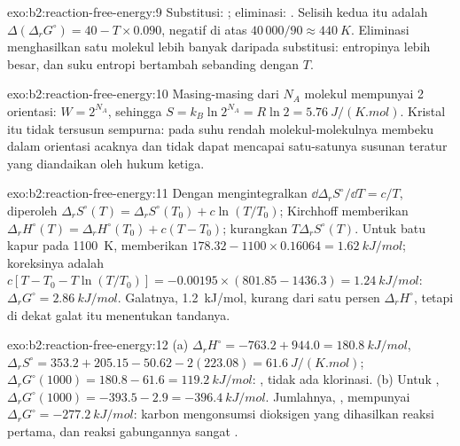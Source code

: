 \begin{solution}{exo:b2:reaction-free-energy:9}
Substitusi: ; eliminasi:
. Selisih kedua  itu adalah $\Delta(\Delta_r G^\circ) = 40 - T \times
0.090$, negatif di atas $40\,000/90 \approx \qty{440}{K}$. Eliminasi
menghasilkan satu molekul lebih banyak daripada substitusi: entropinya
lebih besar, dan suku entropi bertambah sebanding dengan $T$.
\end{solution}

\begin{solution}{exo:b2:reaction-free-energy:10}
Masing-masing dari $N_A$ molekul mempunyai 2 orientasi: $W = 2^{N_A}$,
sehingga $S =
k_B\ln 2^{N_A} = R\ln 2 = \qty{5.76}{J/(K.mol)}$. Kristal
itu tidak tersusun sempurna: pada suhu rendah molekul-molekulnya membeku
dalam orientasi acaknya dan tidak dapat mencapai satu-satunya susunan
teratur yang diandaikan oleh hukum ketiga.
\end{solution}

\begin{solution}{exo:b2:reaction-free-energy:11}
Dengan mengintegralkan $\dd\Delta_r S^\circ/\dd T = c/T$, diperoleh $\Delta_r S^\circ(T) = \Delta_r
S^\circ(T_0) + c\ln(T/T_0)$; Kirchhoff memberikan $\Delta_r H^\circ(T) = \Delta_r
H^\circ(T_0) + c(T - T_0)$; kurangkan $T\Delta_r S^\circ(T)$. Untuk batu
kapur pada \qty{1100}{K},  memberikan $178.32 - 1100 \times 0.16064 = \qty{1.62}{kJ/mol}$; koreksinya adalah $c[T - T_0 - T\ln(T/T_0)] = -0.00195 \times (801.85 - 1436.3) =
\qty{+1.24}{kJ/mol}$: $\Delta_r G^\circ = \qty{2.86}{kJ/mol}$. Galatnya, \qty{1.2}{kJ/mol}, kurang dari satu persen
$\Delta_r H^\circ$, tetapi di dekat  galat itu menentukan
tandanya.
\end{solution}

\begin{solution}{exo:b2:reaction-free-energy:12}
(a) $\Delta_r H^\circ = -763.2 + 944.0 = \qty{+180.8}{kJ/mol}$, $\Delta_r
S^\circ = 353.2 + 205.15 - 50.62 - 2(223.08) = \qty{+61.6}{J/(K.mol)}$;
$\Delta_r G^\circ(1000) = 180.8 - 61.6 = \qty{+119.2}{kJ/mol}$: ,
tidak ada klorinasi. (b) Untuk , $\Delta_r G^\circ(1000) =
-393.5 - 2.9 = \qty{-396.4}{kJ/mol}$. Jumlahnya, , mempunyai $\Delta_r G^\circ = \qty{-277.2}{kJ/mol}$:
karbon mengonsumsi dioksigen yang dihasilkan reaksi pertama, dan reaksi
gabungannya sangat .
\end{solution}

